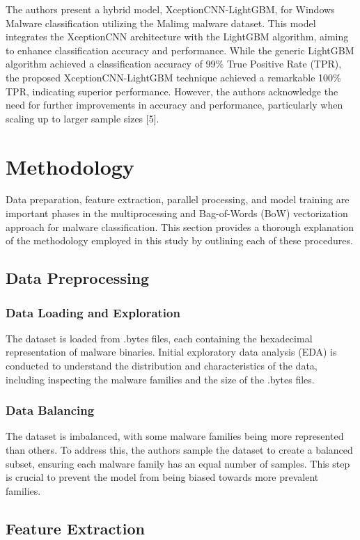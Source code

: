 \documentclass[conference]{IEEEtran}
\begin{document}
The authors present a hybrid model, XceptionCNN-LightGBM, for Windows Malware classification utilizing the Malimg malware dataset. This model integrates the XceptionCNN architecture with the LightGBM algorithm, aiming to enhance classification accuracy and performance. While the generic LightGBM algorithm achieved a classification accuracy of 99\% True Positive Rate (TPR), the proposed XceptionCNN-LightGBM technique achieved a remarkable 100\% TPR, indicating superior performance. However, the authors acknowledge the need for further improvements in accuracy and performance, particularly when scaling up to larger sample sizes [5].


\section{Methodology}
Data preparation, feature extraction, parallel processing, and model training are important phases in the multiprocessing and Bag-of-Words (BoW) vectorization approach for malware classification. This section provides a thorough explanation of the methodology employed in this study by outlining each of these procedures.

\subsection{Data Preprocessing}
\subsubsection{Data Loading and Exploration}
The dataset is loaded from .bytes files, each containing the hexadecimal representation of malware binaries. Initial exploratory data analysis (EDA) is conducted to understand the distribution and characteristics of the data, including inspecting the malware families and the size of the .bytes files.

\subsubsection{Data Balancing}
The dataset is imbalanced, with some malware families being more represented than others. To address this, the authors sample the dataset to create a balanced subset, ensuring each malware family has an equal number of samples. This step is crucial to prevent the model from being biased towards more prevalent families.

\subsection{Feature Extraction}
\end{document}
